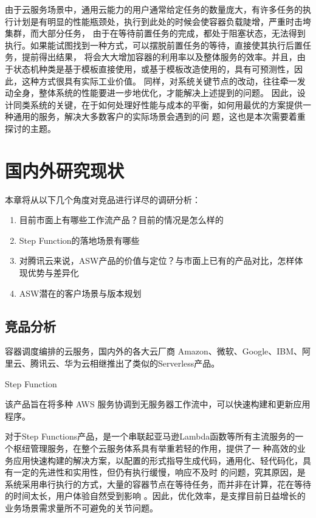 \cite{wlfwyh}
由于云服务场景中，通用云能力的用户通常给定任务的数量庞大，有许多任务的执行计划是有明显的性能瓶颈处，执行到此处的时候会使容器负载陡增，严重时击垮集群，而大部分任务，
由于在等待前置任务的完成，都处于阻塞状态，无法得到执行。如果能试图找到一种方式，可以摆脱前置任务的等待，直接使其执行后置任务，提前得出结果，
将会大大增加容器的利用率以及整体服务的效率。并且，由于状态机种类是基于模板直接使用，或基于模板改造使用的，具有可预测性，因此，这种方式很具有实际工业价值。
同样，对系统关键节点的改动，往往牵一发动全身，整体系统的性能要进一步地优化，才能解决上述提到的问题。
\cite{jywfbpxt}
因此，设计同类系统的关键，在于如何处理好性能与成本的平衡，如何用最优的方案提供一种通用的服务，解决大多数客户的实际场景会遇到的问
题\cite{lu2021microservice}，这也是本次需要着重探讨的主题。


\section{国内外研究现状}

本章将从以下几个角度对竞品进行详尽的调研分析：
\begin{enumerate}
    \item 目前市面上有哪些工作流产品？目前的情况是怎么样的
    \item Step Function的落地场景有哪些
    \item 对腾讯云来说，ASW产品的价值与定位？与市面上已有的产品对比，怎样体现优势与差异化
    \item ASW潜在的客户场景与版本规划
\end{enumerate}

\subsection{竞品分析}

容器调度编排的云服务，国内外的各大云厂商 Amazon、微软、Google、IBM、阿里云、腾讯云、华为云相继推出了类似的Serverless产品。

Step Function

该产品旨在将多种 AWS 服务协调到无服务器工作流中，可以快速构建和更新应用程序\cite{jywfbpxt}。

对于Step Functions产品，是一个串联起亚马逊Lambda函数等所有主流服务的一个枢纽管理服务，在整个云服务体系具有举重若轻的作用，提供了一
种高效的业务应用快速构建的解决方案，以配置的形式指导生成代码，通用化、轻代码化，具有一定的先进性和实用性，但仍有执行缓慢，响应不及时
的问题，究其原因，是系统采用串行执行的方式，大量的容器节点在等待任务，而并非在计算，花在等待的时间太长，用户体验自然受到影响
\cite{jybpmsyc}。因此，优化效率，是支撑目前日益增长的业务场景需求量所不可避免的关节问题。

